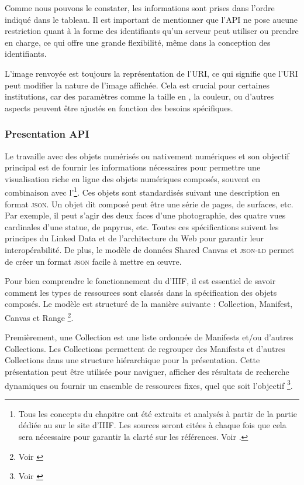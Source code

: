     
    Comme nous pouvons le constater, les informations sont prises dans l'ordre indiqué dans le tableau. Il est important de mentionner que l'API ne pose aucune restriction quant à la forme des identifiants qu'un serveur peut utiliser ou prendre en charge, ce qui offre une grande flexibilité, même dans la conception des identifiants.
    
    L'image renvoyée est toujours la représentation de l'URI, ce qui signifie que l'URI peut modifier la nature de l'image affichée. Cela est crucial pour certaines institutions, car des paramètres comme la taille en , la couleur, ou d'autres aspects peuvent être ajustés en fonction des besoins spécifiques.
    
    \subsubsection{Presentation API}
    
    Le  travaille avec des objets numérisés ou nativement numériques et son objectif principal est de fournir les informations nécessaires pour permettre une visualisation riche en ligne des objets numériques composés, souvent en combinaison avec l'\iapit \footnote{Tous les concepts du chapitre ont été extraits et analysés à partir de la partie dédiée au \papit sur le site d'IIIF. Les sources seront citées à chaque fois que cela sera nécessaire pour garantir la clarté sur les références. Voir \cite{iiifpresentation30}.}. Ces objets sont standardisés suivant une description en format \textsc{json}. Un objet dit composé peut être une série de pages, de surfaces, etc. Par exemple, il peut s'agir des deux faces d'une photographie, des quatre vues cardinales d'une statue, de papyrus, etc. Toutes ces spécifications suivent les principes du Linked Data et de l'architecture du Web pour garantir leur interopérabilité. De plus, le modèle de données Shared Canvas et \textsc{json-ld} permet de créer un format \textsc{json} facile à mettre en œuvre.
    
    Pour bien comprendre le fonctionnement du  d'IIIF, il est essentiel de savoir comment les types de ressources sont classés dans la spécification des objets composés. Le modèle est structuré de la manière suivante : Collection, Manifest, Canvas et Range \footnote{Voir \cite{iiifpresentation30}}.
    
    Premièrement, une Collection est une liste ordonnée de Manifests et/ou d'autres Collections. Les Collections permettent de regrouper des Manifests et d'autres Collections dans une structure hiérarchique pour la présentation. Cette présentation peut être utilisée pour naviguer, afficher des résultats de recherche dynamiques ou fournir un ensemble de ressources fixes, quel que soit l'objectif \footnote{Voir \cite{iiifpresentation30}}.
    
